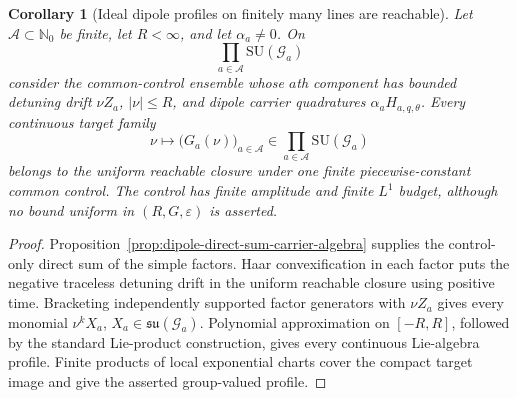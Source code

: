 \documentclass[11pt]{article}
\newtheorem{corollary}[theorem]{Corollary}
\theoremstyle{remark}
\begin{document}
\begin{corollary}[Ideal dipole profiles on finitely many lines are reachable]
\label{cor:ideal-dipole-multiline-profiles}
Let $\mathcal A\subset\mathbb N_0$ be finite, let $R<\infty$, and let
$\alpha_a\neq0$.  On
\[
 \prod_{a\in\mathcal A}\mathrm{SU}(\mathcal G_a)
\]
consider the common-control ensemble whose $a$th component has bounded
detuning drift $\nu Z_a$, $|\nu|\leq R$, and dipole carrier quadratures
$\alpha_aH_{a,q,\theta}$.  Every continuous target family
\[
 \nu\longmapsto
 \bigl(G_a(\nu)\bigr)_{a\in\mathcal A}
 \in
 \prod_{a\in\mathcal A}\mathrm{SU}(\mathcal G_a)
\]
belongs to the uniform reachable closure under one finite piecewise-constant
common control.  The control has finite amplitude and finite $L^1$ budget,
although no bound uniform in $(R,G,\varepsilon)$ is asserted.
\end{corollary}

\begin{proof}
Proposition~\ref{prop:dipole-direct-sum-carrier-algebra} supplies the
control-only direct sum of the simple factors.  Haar convexification in each
factor puts the negative traceless detuning drift in the uniform reachable
closure using positive time.  Bracketing independently supported factor
generators with $\nu Z_a$ gives every monomial
$\nu^kX_a$, $X_a\in\mathfrak{su}(\mathcal G_a)$.  Polynomial approximation
on $[-R,R]$, followed by the standard Lie-product construction, gives every
continuous Lie-algebra profile.  Finite products of local exponential charts
cover the compact target image and give the asserted group-valued profile.
\end{proof}
\end{document}
